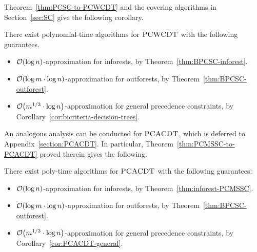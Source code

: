 Theorem~\ref{thm:PCSC-to-PCWCDT} and the covering algorithms in Section~\ref{sec:SC} give the following corollary.
\begin{corollary}\label{cor:PCWCDT-special-cases}
    There exist polynomial-time algorithms for $\textup{\textsc{PCWCDT}}$ with the following guarantees.
    \begin{itemize}
        \item $\mathcal{O}\mathopen{}\left( \log n \right)$-approximation for inforests, by Theorem~\ref{thm:BPCSC-inforest}.
        \item $\mathcal{O}\mathopen{}\left( \log m\cdot\log n \right)$-approximation for outforests, by Theorem~\ref{thm:BPCSC-outforest}.
        \item $\mathcal{O}\mathopen{}\left( m^{1/3}\cdot\log n \right)$-approximation for general precedence constraints, by Corollary~\ref{cor:bicriteria-decision-trees}.
    \end{itemize}
\end{corollary}


An analogous analysis can be conducted for $\textup{\textsc{PCACDT}}$, which is deferred to Appendix~\ref{section:PCACDT}. In particular, Theorem~\ref{thm:PCMSSC-to-PCACDT} proved therein gives the following.
\begin{corollary}\label{cor:PCACDT-special-cases}
    There exist poly-time algorithms for $\textup{\textsc{PCACDT}}$ with the following guarantees:
    \begin{itemize}
        \item $\mathcal{O}\mathopen{}\left( \log n \right)$-approximation for inforests, by Theorem~\ref{thm:inforest-PCMSSC}.
        \item $\mathcal{O}\mathopen{}\left( \log m\cdot\log n \right)$-approximation for outforests, by Theorem~\ref{thm:BPCSC-outforest}.
        \item $\mathcal{O}\mathopen{}\left( m^{1/3}\cdot\log n \right)$-approximation for general precedence constraints, by Corollary~\ref{cor:PCACDT-general}.
    \end{itemize}
\end{corollary}
